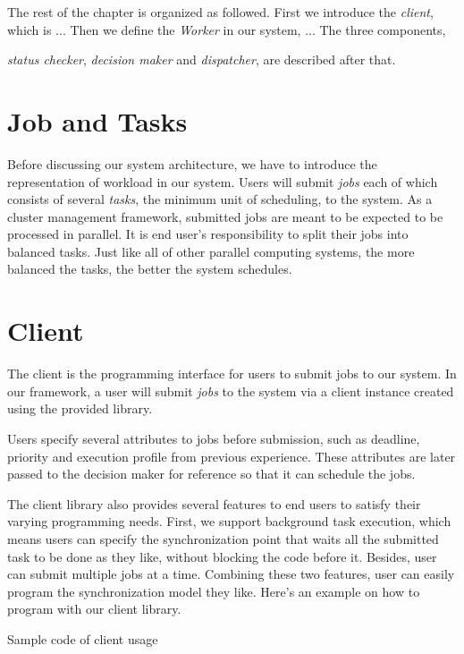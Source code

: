 The rest of the chapter is organized as followed.  
First we introduce the \emph{client}, which is ...
Then we define the \emph{Worker} in our system, ...
The three components, { \emph{status checker}, \emph{decision maker} and
\emph{dispatcher}, are described after that.

\section{Job and Tasks}

Before discussing our system architecture, we have to introduce the
representation of workload in our system.
Users will submit \emph{jobs} each of which consists of several
\emph{tasks}, the minimum unit of scheduling, to the system.
As a cluster management framework, submitted jobs are meant to be
expected to be processed in parallel.
It is end user's responsibility to split their jobs into balanced tasks.
Just like all of other parallel computing systems, the more balanced the
tasks, the better the system schedules.

\section{Client}

The client is the programming interface for users to submit jobs to our
system.
In our framework, a user will submit \emph{jobs} to the system via a
client instance created using the provided library.

Users specify several attributes to jobs before submission, such as
deadline, priority and execution profile from previous experience.
These attributes are later passed to the decision maker for reference so
that it can schedule the jobs.

The client library also provides several features to end users to
satisfy their varying programming needs.
First, we support background task execution, which means users can
specify the synchronization point that waits all the submitted task to
be done as they like, without blocking the code before it.
Besides, user can submit multiple jobs at a time.
Combining these two features, user can easily program the
synchronization model they like.
Here's an example on how to program with our client library.

\begin{Example Code}
  
  \caption{Sample code of client usage}
\end{Example Code}

}
